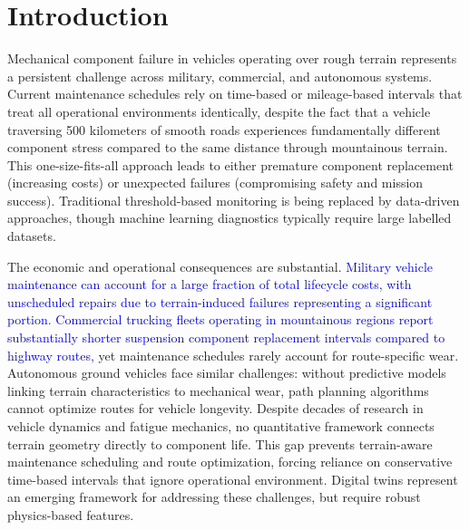\documentclass[11pt]{article}
\begin{document}
\newpage



\section*{Introduction}

Mechanical component failure in vehicles operating over rough terrain represents a persistent challenge across military, commercial, and autonomous systems. Current maintenance schedules rely on time-based or mileage-based intervals that treat all operational environments identically, despite the fact that a vehicle traversing 500 kilometers of smooth roads experiences fundamentally different component stress compared to the same distance through mountainous terrain. This one-size-fits-all approach leads to either premature component replacement (increasing costs) or unexpected failures (compromising safety and mission success). Traditional threshold-based monitoring is being replaced by data-driven approaches\cite{Chen2024}, though machine learning diagnostics typically require large labelled datasets\cite{Lei2020}.

The economic and operational consequences are substantial. \textcolor{blue}{Military vehicle maintenance can account for a large fraction of total lifecycle costs\cite{Wong2022}, with unscheduled repairs due to terrain-induced failures representing a significant portion. Commercial trucking fleets operating in mountainous regions report substantially shorter suspension component replacement intervals compared to highway routes,} yet maintenance schedules rarely account for route-specific wear. Autonomous ground vehicles face similar challenges: without predictive models linking terrain characteristics to mechanical wear, path planning algorithms cannot optimize routes for vehicle longevity\cite{Yurtsever2020}. Despite decades of research in vehicle dynamics and fatigue mechanics, no quantitative framework connects terrain geometry directly to component life. This gap prevents terrain-aware maintenance scheduling and route optimization, forcing reliance on conservative time-based intervals that ignore operational environment. Digital twins represent an emerging framework\cite{Li2023} for addressing these challenges, but require robust physics-based features.
\end{document}
